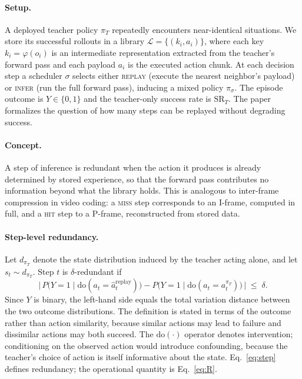 \documentclass{article}
\begin{document}
\paragraph{Setup.}
A deployed teacher policy $\pi_T$ repeatedly encounters near-identical
situations. We store its successful rollouts in a library
$\mathcal{L} = \{(k_i, a_i)\}$, where each key $k_i = \varphi(o_i)$ is an
intermediate representation extracted from the teacher's forward pass and each
payload $a_i$ is the executed action chunk. At each decision step a scheduler
$\sigma$ selects either \textsc{replay} (execute the nearest neighbor's
payload) or \textsc{infer} (run the full forward pass), inducing a mixed policy
$\pi_\sigma$. The episode outcome is $Y \in \{0,1\}$ and the teacher-only
success rate is $\mathrm{SR}_T$. The paper formalizes the question of how many
steps can be replayed without degrading success.

\paragraph{Concept.}
A step of inference is redundant when the action it produces is already
determined by stored experience, so that the forward pass contributes no
information beyond what the library holds. This is analogous to inter-frame
compression in video coding: a \textsc{miss} step corresponds to an I-frame,
computed in full, and a \textsc{hit} step to a P-frame, reconstructed from
stored data.

\paragraph{Step-level redundancy.}
Let $d_{\pi_T}$ denote the state distribution induced by the teacher acting
alone, and let $s_t \sim d_{\pi_T}$. Step $t$ is $\delta$-redundant if
\begin{equation}
\bigl|\,P\bigl(Y{=}1 \mid \mathrm{do}(a_t = \hat{a}_t^{\mathrm{replay}})\bigr)
      - P\bigl(Y{=}1 \mid \mathrm{do}(a_t = a_t^{\pi_T})\bigr)\,\bigr| \;\le\; \delta .
\label{eq:step}
\end{equation}
Since $Y$ is binary, the left-hand side equals the total variation distance
between the two outcome distributions. The definition is stated in terms of the
outcome rather than action similarity, because similar actions may lead to
failure and dissimilar actions may both succeed. The $\mathrm{do}(\cdot)$
operator denotes intervention; conditioning on the observed action would
introduce confounding, because the teacher's choice of action is itself
informative about the state. Eq.~\ref{eq:step} defines redundancy; the
operational quantity is Eq.~\ref{eq:R}.
\end{document}
